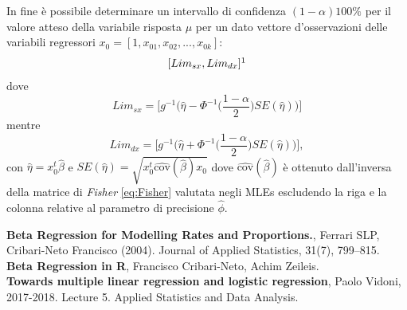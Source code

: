 \documentclass[twoside,twocolumn]{article}
\begin{document}
In fine è possibile determinare un intervallo di confidenza $(1-\alpha)100\%$ per il valore atteso della variabile risposta $\mu$ per un dato vettore d'osservazioni delle variabili regressori $x_0=[1,x_{01},x_{02},...,x_{0k}]$:
$$[Lim_{sx}, Lim_{dx}]\footnote{Tale intervallo è valido solo per funzioni di collegamento $g(\cdot)$ strettamente crescenti.}$$ dove 
$$Lim_{sx}=\bigg[ g^{-1}\bigg(\hat{\eta} -\Phi^{-1}\Big(\frac{1-\alpha}{2}\Big)SE(\hat{\eta})\bigg)  \bigg]  $$
mentre
$$ Lim_{dx}=\bigg[ g^{-1}\bigg(\hat{\eta} +\Phi^{-1}\Big(\frac{1-\alpha}{2}\Big)SE(\hat{\eta})\bigg)  \bigg], $$
con $\hat{\eta}=x_0^t \hat{\beta}$ e $SE(\hat{\eta})=\sqrt{x_0^t \widehat{\text{cov}}(\hat{\beta})x_0}$ dove $\widehat{\text{cov}}(\hat{\beta})$ è ottenuto dall'inversa della matrice di \emph{Fisher} \eqref{eq:Fisher} valutata negli MLEs escludendo la riga e la colonna relative al parametro di precisione $\hat{\phi}$.
\newpage
\tableofcontents
		\begin{thebibliography}{99} 
	 \textbf{Beta Regression for Modelling Rates and Proportions.}, Ferrari SLP, Cribari-Neto Francisco (2004).  Journal of Applied Statistics, 31(7), 799–815.
	 \textbf{Beta Regression in R}, Francisco Cribari-Neto, Achim Zeileis.\\
	 \textbf{Towards multiple linear regression and logistic regression}, Paolo Vidoni, 2017-2018. Lecture 5. Applied Statistics and Data Analysis.
	\end{thebibliography}
\end{document}
